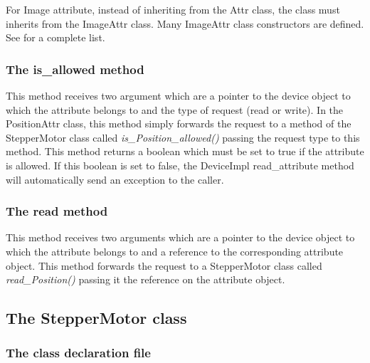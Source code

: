 For Image attribute, instead of inheriting from the Attr class, the
class must inherits from the ImageAttr class. Many ImageAttr
class constructors are defined. See \cite{TANGO_ref_man}for a complete
list. 


\subsubsection{The is\_allowed method}

This method receives two argument which are a pointer to the device
object to which the attribute belongs to and the type of request (read
or write). In the PositionAttr class, this method simply \textquotedbl{}forwards\textquotedbl{}
the request to a method of the StepperMotor class called \emph{is\_Position\_allowed()}
passing the request type to this method. This method returns a boolean
which must be set to true if the attribute is allowed. If this boolean
is set to false, the DeviceImpl read\_attribute
method will automatically send an exception to the caller.


\subsubsection{The read method}

This method receives two arguments which are a pointer to the device
object to which the attribute belongs to and a reference to the corresponding
attribute object. This method \textquotedbl{}forwards\textquotedbl{}
the request to a StepperMotor class called \emph{read\_Position()}
passing it the reference on the attribute object.




\subsection{The StepperMotor class}


\subsubsection{The class declaration file}

